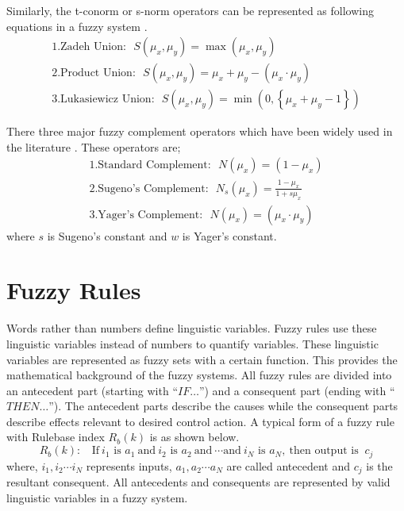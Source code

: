 Similarly, the t\hyp{}conorm or s\hyp{}norm operators can be represented as following equations in a fuzzy system \cite{bookBogdan2006a}.
\[\begin{array}{l}
1. \text{Zadeh Union:} ~~~S\left( {{\mu _x},{\mu _y}} \right) = \max \left( {{\mu _x},{\mu _y}} \right)\\
2. \text{Product Union:} ~~~S\left( {{\mu _x},{\mu _y}} \right) = {\mu _x} + {\mu _y} - \left( {{\mu _x} \cdot {\mu _y}} \right)\\
3. \text{Lukasiewicz Union:} ~~~S\left( {{\mu _x},{\mu _y}} \right) = \min \left( {0,\left\{ {{\mu _x} + {\mu _y} - 1} \right\}} \right)
\end{array}\]

There three major fuzzy complement operators which have been widely used in the literature \cite{bookBogdan2006a}. These operators are;
\[\begin{array}{l}
1. \text{Standard Complement:} ~~~N\left( \mu _x \right) = \left( 1 - \mu _x\right)\\
2. \text{Sugeno's Complement:} ~~~{N_s}\left( {{\mu _x}} \right) = \frac{{1 - {\mu _x}}}{{1 + s{\mu _x}}}\\
3. \text{Yager's Complement:} ~~~N\left( \mu _x \right) = \left( {{\mu _x} \cdot {\mu _y}} \right)
\end{array}\] 
where $ s $ is Sugeno's constant and $ w $ is Yager's constant.

\section{Fuzzy Rules}
Words rather than numbers define linguistic variables. Fuzzy rules use these linguistic variables instead of numbers to quantify variables.  These linguistic variables are represented as fuzzy sets with a certain function. This provides the mathematical background of the fuzzy systems. All fuzzy rules are divided into an antecedent part (starting with ``$IF \ldots $'')
and a consequent part (ending with ``$THEN \ldots $''). The antecedent parts describe the causes while the consequent parts describe effects relevant to desired control action. A typical form of a fuzzy rule with Rulebase index $ {R_b}\left( k \right) $ is as shown below.
\[{R_b}\left( k \right):~~~~\text{If}~i_1\text{ is }{a_1}~\text{and}~i_2\text{ is }{a_2}~\text{and}~\cdots \text{and}~i_N\text{ is }{a_N},~\text{then output is }~{c_j}\]
where, $ {i_1},{i_2} \cdots {i_N} $ represents inputs,  $ {a_1},{a_2} \cdots {a_N} $ are called antecedent and $ c_j $ is the resultant consequent.
All antecedents and consequents are represented by valid linguistic variables in a fuzzy system.
